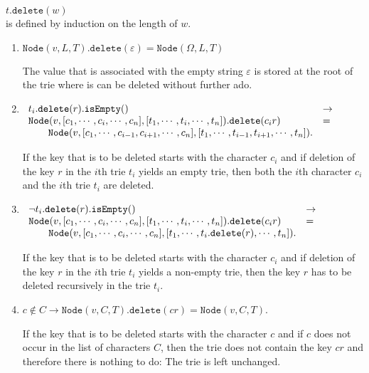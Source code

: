 \hspace*{1.3cm} 
$t.\mathtt{delete}(w)$
\\[0.2cm]
is defined by induction on the length of  $w$.
\begin{enumerate}
\item $\mathtt{Node}(v,L,T).\mathtt{delete}(\varepsilon) = \mathtt{Node}(\Omega,L,T)$

      The value that is associated with the empty  string $\varepsilon$ is stored at the root of the
      trie where is can be deleted without further ado.
\item $\begin{array}[t]{ll}
       t_i.\mathtt{delete}(r).\mathtt{isEmpty}()   & \rightarrow \\
       \mathtt{Node}(v, [c_1,\cdots,c_i,\cdots,c_n],[t_1,\cdots,t_i,\cdots,t_n]).\mathtt{delete}(c_ir) 
       & = \\
       \qquad 
       \mathtt{Node}(v, [c_1,\cdots,c_{i-1},c_{i+1},\cdots,c_n],[t_1,\cdots,t_{i-1},t_{i+1},\cdots,t_n]).
       \end{array}
       $

       If  the key that is to be deleted starts with the character $c_i$ and if deletion of  the key
       $r$ in the $i$th  trie $t_i$ yields an empty
       trie, then both the $i$th character $c_i$ and the $i$th trie $t_i$ are deleted.
\item $\begin{array}[t]{ll}
       \neg t_i.\mathtt{delete}(r).\mathtt{isEmpty}()   & \rightarrow \\
       \mathtt{Node}(v, [c_1,\cdots,c_i,\cdots,c_n],[t_1,\cdots,t_i,\cdots,t_n]).\mathtt{delete}(c_ir) 
       & = \\
       \qquad \mathtt{Node}(v, [c_1,\cdots,c_i,\cdots,c_n],[t_1,\cdots,t_i.\mathtt{delete}(r),\cdots,t_n]).
       \end{array}
       $

       If  the key that is to be deleted starts with the character $c_i$ and if deletion of  the key
       $r$ in the $i$th  trie $t_i$ yields a non-empty trie, then the key $r$ has to be deleted recursively
       in the trie $t_i$.
\item $c \notin C \rightarrow \mathtt{Node}(v, C, T).\mathtt{delete}(cr) =
       \mathtt{Node}(v, C, T)$. 
       
       If  the key that is to be deleted starts with the character $c$ and if $c$ does not occur in
       the list of characters $C$, then the trie does not contain the key $cr$ and therefore there
       is nothing  to do:  The trie is left unchanged.
\end{enumerate}

